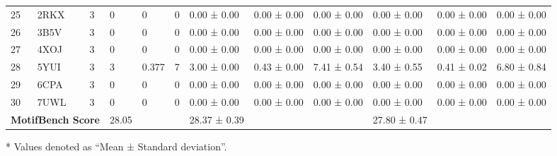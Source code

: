 \begin{table}[H]
{\begin{threeparttable}
\begin{tabular}{|p{0.3cm}|p{0.8cm}|p{0.2cm}|p{0.9cm}|p{0.9cm}|p{0.8cm}|p{1.6cm}|p{1.5cm}|p{1.7cm}|p{1.6cm}|p{1.5cm}|p{1.7cm}|}
25          & 2RKX            & 3                 & 0                         & 0                & 0                     & 0.00 ± 0.00           & 0.00 ± 0.00      & 0.00 ± 0.00                       & 0.00 ± 0.00           & 0.00 ± 0.00      & 0.00 ± 0.00                        \\
26          & 3B5V            & 3                 & 0                         & 0                & 0                     & 0.00 ± 0.00           & 0.00 ± 0.00      & 0.00 ± 0.00                       & 0.00 ± 0.00           & 0.00 ± 0.00      & 0.00 ± 0.00                        \\
27          & 4XOJ            & 3                 & 0                         & 0                & 0                     & 0.00 ± 0.00           & 0.00 ± 0.00      & 0.00 ± 0.00                       & 0.00 ± 0.00           & 0.00 ± 0.00      & 0.00 ± 0.00                        \\
28          & 5YUI            & 3                 & 3                         & 0.377            & 7                     & 3.00 ± 0.00           & 0.43 ± 0.00      & 7.41 ± 0.54                       & 3.40 ± 0.55           & 0.41 ± 0.02      & 6.80 ± 0.84                        \\
29          & 6CPA            & 3                 & 0                         & 0                & 0                     & 0.00 ± 0.00           & 0.00 ± 0.00      & 0.00 ± 0.00                       & 0.00 ± 0.00           & 0.00 ± 0.00      & 0.00 ± 0.00                        \\
30          & 7UWL            & 3                 & 0                         & 0                & 0                     & 0.00 ± 0.00           & 0.00 ± 0.00      & 0.00 ± 0.00                       & 0.00 ± 0.00           & 0.00 ± 0.00      & 0.00 ± 0.00                        \\ 
\hline
\multicolumn{3}{|c|}{\textbf{MotifBench Score}}   & 28.05 & & & 28.37 ± 0.39 & & & 27.80 ± 0.47 & & \\
\hline
\end{tabular}
\begin{tablenotes}
    \footnotesize
    \item[*] Values denoted as ``Mean ± Standard deviation''.
\end{tablenotes}
\end{threeparttable}
}
\end{table}




